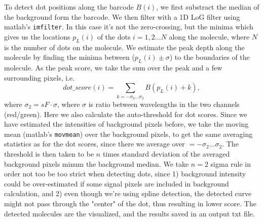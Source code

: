 \documentclass{article}
\begin{document}
To detect dot positions along the barcode $B(i)$, we first substract the median of the background form the barcode. We then filter with a 1D LoG filter using matlab's \texttt{imfilter}. In this case it's not the zero-crossing, but the minima which gives us the locations $p_L(i)$ of the dots $i=1,2\ldots N$ along the molecule, where $N$ is the number of dots on the molecule. We estimate the peak depth along the molecule by finding the minima between ($p_L(i) \pm \sigma$) to the boundaries of the molecule. As the peak score, we take the sum over the peak and a few surrounding pixels, i.e. 
%
\begin{equation}
	dot\_score(i) = \sum_{k=-\sigma_2\ldots \sigma_2}  B(p_L(i)+k),
\end{equation}
 where $\sigma_2 = sF\cdot \sigma$, where $\sigma$ is ratio between wavelengths in the two channels (red/green).
%
Here we also calculate the auto-threshold for dot scores. Since we have estimated the intensities of background pixels before, we take the moving mean (matlab's \texttt{movmean}) over the background pixels, to get the same averaging statistics as for the dot scores, since there we average over $=-\sigma_2\ldots \sigma_2$. The threshold is then taken to be $n$ times standard deviation of the averaged background pixels minum the background median. We take $n=2$ sigma rule in order not too be too strict when detecting dots, since 1) background intensity could be over-estimated if some signal pixels are included in background calculation, and 2) even though we're using spline detection, the detected curve might not pass through the "center" of the dot, thus resulting in lower score. The detected molecules are the visualized, and the results saved in an output txt file.
\end{document}
